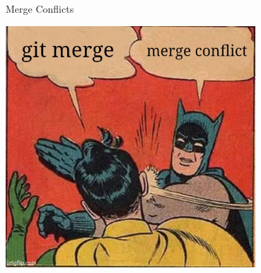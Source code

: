 \documentclass[aspectratio=169]{beamer}
\begin{document}
\begin{frame}{Merge Conflicts}
  \begin{center}
  \includegraphics[width=0.7\textwidth,height=0.9\textheight]{figures/mergeConflict.jpg}
  \end{center}
\end{frame}
\end{document}
